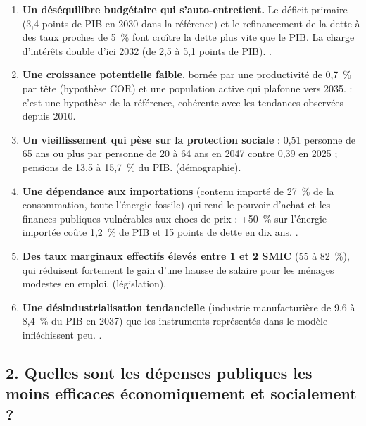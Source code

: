 \begin{enumerate}
\item \textbf{Un déséquilibre budgétaire qui s'auto-entretient.} Le déficit primaire (3,4 points de PIB en 2030 dans la
référence) et le refinancement de la dette à des taux proches de 5~\% font croître la dette plus vite que le PIB. La
charge d'intérêts double d'ici 2032 (de 2,5 à 5,1 points de PIB). .
\item \textbf{Une croissance potentielle faible}, bornée par une productivité de 0,7~\% par tête (hypothèse COR) et une
population active qui plafonne vers 2035.  : c'est une hypothèse de la référence, cohérente avec les
tendances observées depuis 2010.
\item \textbf{Un vieillissement qui pèse sur la protection sociale} : 0,51 personne de 65 ans ou plus par personne de 20 à
64 ans en 2047 contre 0,39 en 2025 ; pensions de 13,5 à 15,7~\% du PIB.  (démographie).
\item \textbf{Une dépendance aux importations} (contenu importé de 27~\% de la consommation, toute l'énergie fossile) qui
rend le pouvoir d'achat et les finances publiques vulnérables aux chocs de prix : +50~\% sur l'énergie importée coûte
1,2~\% de PIB et 15 points de dette en dix ans. .
\item \textbf{Des taux marginaux effectifs élevés entre 1 et 2 SMIC} (55 à 82~\%), qui réduisent fortement le gain d'une
hausse de salaire pour les ménages modestes en emploi.  (législation).
\item \textbf{Une désindustrialisation tendancielle} (industrie manufacturière de 9,6 à 8,4~\% du PIB en 2037) que les
instruments représentés dans le modèle infléchissent peu. .
\end{enumerate}

\subsection*{2. Quelles sont les dépenses publiques les moins efficaces économiquement et socialement ?}

